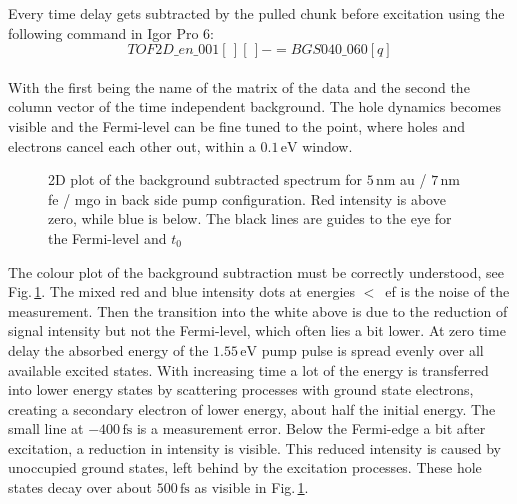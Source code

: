 \documentclass[a4paper,12pt,twoside]{article}
\begin{document}
\noindent	Every time delay gets subtracted by the pulled chunk before excitation using the following command in Igor Pro 6:
    \begin{equation}
        \label{eqBGS}
    TOF2D\_en\_001\left[ \,\right]\left[\,  \right]-=BGS040\_060\left[ q \right]
    \end{equation}\\
With the first being the name of the matrix of the data and the second the column vector of the time independent background. The hole dynamics becomes visible and the Fermi-level can be fine tuned to the point, where holes and electrons cancel each other out, within a $0.1\,\mathrm{eV}$ window. 
	\begin{figure}[H]
		\caption{2D plot of the background subtracted spectrum for $5\,\mathrm{nm}$ \gls{au} / $7\,\mathrm{nm}$ \gls{fe} / \gls{mgo} in back side pump configuration. Red intensity is above zero, while blue is below. The black lines are guides to the eye for the Fermi-level and $t_0$}
	    	\label{BGS}
	\end{figure}
The colour plot of the background subtraction must be correctly understood, see Fig.\,\ref{BGS}. The mixed red and blue intensity dots at energies $<$\, \gls{ef} is the noise of the measurement.  Then the transition into the white above is due to the reduction of signal intensity but not the Fermi-level, which often lies a bit lower. At zero time delay the absorbed energy of the $1.55\,\mathrm{\mbox{eV}}$ pump pulse is spread evenly over all available excited states. With increasing time a lot of the energy is transferred into lower energy states by scattering processes with ground state electrons, creating a secondary electron of lower energy, about half the initial energy. The small line at $-400\,\mathrm{\mbox{fs}}$ is a measurement error. Below the Fermi-edge a bit after excitation, a reduction in intensity is visible. This reduced intensity is caused by unoccupied ground states, left behind by the excitation processes. These hole states decay over about $500\,\mathrm{\mbox{fs}}$ as visible in Fig.\,\ref{BGS}.
\end{document}

